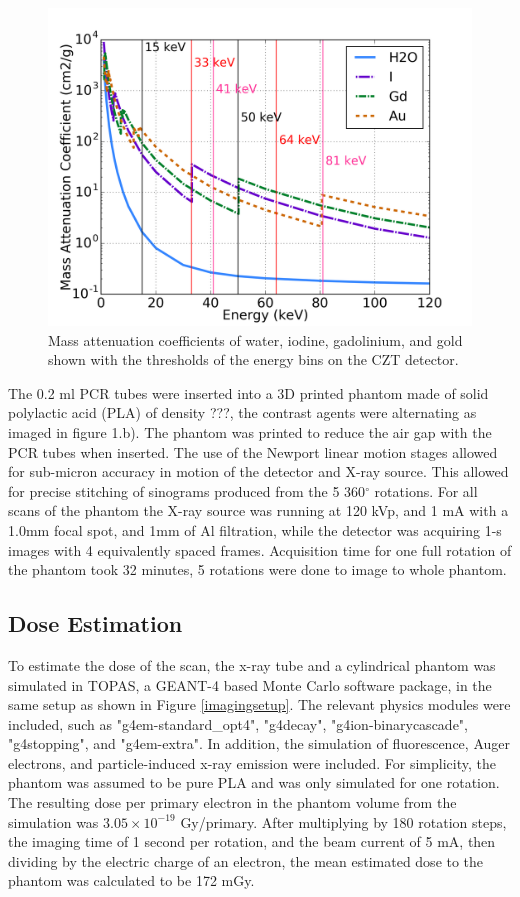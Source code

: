 \documentclass[journal, a4paper]{IEEEtran}
\begin{document}
\begin{figure}[htbp]
\includegraphics[width=\linewidth]{Figures/sCT_attencoeffs.png}
\caption{Mass attenuation coefficients of water, iodine, gadolinium, and gold shown with the thresholds of the energy bins on the CZT detector.}
\label{attencoeffs}
\end{figure}

The 0.2 ml PCR tubes were inserted into a 3D printed phantom made of solid polylactic acid (PLA) of density ???, the contrast agents were alternating as imaged in figure 1.b). The phantom was printed to reduce the air gap with the PCR tubes when inserted. The use of the Newport linear motion stages allowed for sub-micron accuracy in motion of the detector and X-ray source. This allowed for precise stitching of sinograms produced from the 5 360$^\circ$ rotations. For all scans of the phantom the X-ray source was running at 120 kVp, and 1 mA with a 1.0mm focal spot, and 1mm of Al filtration, while the detector was acquiring 1-s images with 4 equivalently spaced frames. Acquisition time for one full rotation of the phantom took 32 minutes, 5 rotations were done to image to whole phantom. 

\subsection{Dose Estimation}
To estimate the dose of the scan, the x-ray tube and a cylindrical phantom was simulated in TOPAS\cite{topas}, a GEANT-4 based Monte Carlo software package, in the same setup as shown in Figure \ref{imagingsetup}. The relevant physics modules were included, such as "g4em-standard\_opt4", "g4decay", "g4ion-binarycascade", "g4stopping", and "g4em-extra". In addition, the simulation of fluorescence, Auger electrons, and particle-induced x-ray emission were included. For simplicity, the phantom was assumed to be pure PLA and was only simulated for one rotation. The resulting dose per primary electron in the phantom volume from the simulation was $3.05 \times 10^{-19}$ Gy/primary. After multiplying by 180 rotation steps, the imaging time of 1 second per rotation, and the beam current of 5 mA, then dividing by the electric charge of an electron, the mean estimated dose to the phantom was calculated to be 172 mGy.
\end{document}
